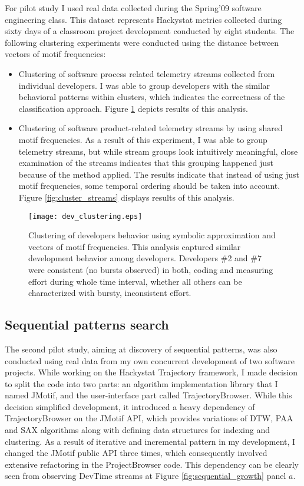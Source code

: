 For pilot study I used real data collected during the Spring'09 software engineering class. This dataset represents Hackystat metrics collected during sixty days of a classroom project development conducted by eight students. The following clustering experiments were conducted using the distance between vectors of motif frequencies:
\begin{itemize}
	\item Clustering of software process related telemetry streams collected from individual developers. I was able to group developers with the similar behavioral patterns within clusters, which indicates the correctness of the classification approach. Figure \ref{fig:cluster_developers} depicts results of this analysis.
	\item Clustering of software product-related telemetry streams by using shared motif frequencies. As a result of this experiment, I was able to group telemetry streams, but while stream groups look intuitively meaningful, close examination of the streams indicates that this grouping happened just because of the method applied. The results indicate that instead of using just motif frequencies, some temporal ordering should be taken into account. Figure \ref{fig:cluster_streams} displays results of this analysis.
\end{itemize}

\begin{figure}[tbp]
   \centering
   \texttt{[image: dev\_clustering.eps]}
   \caption{Clustering of developers behavior using symbolic approximation and vectors of motif frequencies. This analysis captured similar development behavior among developers. Developers \#2 and \#7 were consistent (no bursts observed) in both, coding and measuring effort during whole time interval, whether all others can be characterized with bursty, inconsistent effort.}
   \label{fig:cluster_developers}
\end{figure}

\subsection{Sequential patterns search}
The second pilot study, aiming at discovery of sequential patterns, was also conducted using real data from my own concurrent development of two software projects. While working on the Hackystat Trajectory framework, I made decision to split the code into two parts: an algorithm implementation library that I named JMotif, and the user-interface part called TrajectoryBrowser. While this decision simplified development, it introduced a heavy dependency of TrajectoryBrowser on the JMotif API, which provides variations of DTW, PAA and SAX algorithms along with defining data structures for indexing and clustering. As a result of iterative and incremental pattern in my development, I changed the JMotif public API three times, which consequently involved extensive refactoring in the ProjectBrowser code. This dependency can be clearly seen from observing DevTime streams at Figure \ref{fig:sequential_growth} panel $a$. 

